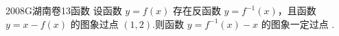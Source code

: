 
\begin{problem}{2008}{G}{湖南卷}{13}{函数}
设函数 $y=f(x)$ 存在反函数 $y=f^{-1}(x)$，且函数 $y=x-f(x)$ 的图象过点 $(1,2)$.则函数 $y=f^{-1}(x)-x$ 的图象一定过点 \underline{\hspace{4em}}.
\end{problem}

\begin{answer}

\end{answer}

\begin{solutions}

\end{solutions}